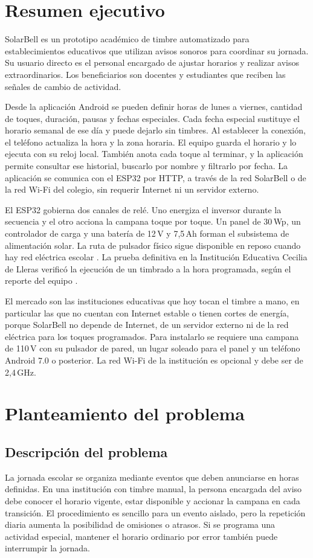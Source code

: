 \documentclass[a4paper,11pt]{article}
\newcommand{\seccionsinnumero}[1]{%
  \section*{#1}\phantomsection\addcontentsline{toc}{section}{#1}}
\begin{document}
\seccionsinnumero{Resumen ejecutivo}
SolarBell es un prototipo académico de timbre automatizado para establecimientos educativos que utilizan avisos sonoros para coordinar su jornada. Su usuario directo es el personal encargado de ajustar horarios y realizar avisos extraordinarios. Los beneficiarios son docentes y estudiantes que reciben las señales de cambio de actividad.

Desde la aplicación Android se pueden definir horas de lunes a viernes, cantidad de toques, duración, pausas y fechas especiales. Cada fecha especial sustituye el horario semanal de ese día y puede dejarlo sin timbres. Al establecer la conexión, el teléfono actualiza la hora y la zona horaria. El equipo guarda el horario y lo ejecuta con su reloj local. También anota cada toque al terminar, y la aplicación permite consultar ese historial, buscarlo por nombre y filtrarlo por fecha. La aplicación se comunica con el ESP32 por HTTP, a través de la red SolarBell o de la red Wi-Fi del colegio, sin requerir Internet ni un servidor externo.

El ESP32 gobierna dos canales de relé. Uno energiza el inversor durante la secuencia y el otro acciona la campana toque por toque. Un panel de 30\,Wp, un controlador de carga y una batería de 12\,V y 7,5\,Ah forman el subsistema de alimentación solar. La ruta de pulsador físico sigue disponible en reposo cuando hay red eléctrica escolar \cite{ficha,diagrama}. La prueba definitiva en la Institución Educativa Cecilia de Lleras verificó la ejecución de un timbrado a la hora programada, según el reporte del equipo \cite{evidencia}.

El mercado son las instituciones educativas que hoy tocan el timbre a mano, en particular las que no cuentan con Internet estable o tienen cortes de energía, porque SolarBell no depende de Internet, de un servidor externo ni de la red eléctrica para los toques programados. Para instalarlo se requiere una campana de 110\,V con su pulsador de pared, un lugar soleado para el panel y un teléfono Android 7.0 o posterior. La red Wi-Fi de la institución es opcional y debe ser de 2,4\,GHz.

\clearpage
\section{Planteamiento del problema}
\subsection{Descripción del problema}
La jornada escolar se organiza mediante eventos que deben anunciarse en horas definidas. En una institución con timbre manual, la persona encargada del aviso debe conocer el horario vigente, estar disponible y accionar la campana en cada transición. El procedimiento es sencillo para un evento aislado, pero la repetición diaria aumenta la posibilidad de omisiones o atrasos. Si se programa una actividad especial, mantener el horario ordinario por error también puede interrumpir la jornada.
\end{document}
